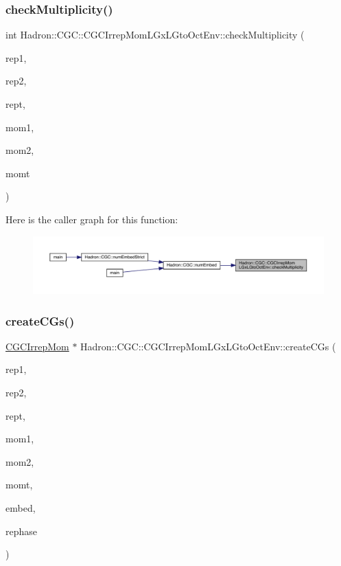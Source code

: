\subsubsection{\texorpdfstring{checkMultiplicity()}{checkMultiplicity()}}
{\footnotesize\ttfamily int Hadron\+::\+C\+G\+C\+::\+C\+G\+C\+Irrep\+Mom\+L\+Gx\+L\+Gto\+Oct\+Env\+::check\+Multiplicity (\begin{DoxyParamCaption}\item[{const std\+::string \&}]{rep1,  }\item[{const std\+::string \&}]{rep2,  }\item[{const std\+::string \&}]{rept,  }\item[{const Array\+Int \&}]{mom1,  }\item[{const Array\+Int \&}]{mom2,  }\item[{const Array\+Int \&}]{momt }\end{DoxyParamCaption})}

Here is the caller graph for this function\+:
\nopagebreak
\begin{figure}[H]
\begin{center}
\leavevmode
\includegraphics[width=350pt]{d1/d0f/namespaceHadron_1_1CGC_1_1CGCIrrepMomLGxLGtoOctEnv_aa39bf5f462bddb44a91da07a903947f4_icgraph}
\end{center}
\end{figure}
\mbox{\label{namespaceHadron_1_1CGC_1_1CGCIrrepMomLGxLGtoOctEnv_a326be3440106df05ce61c23e713f7312}} 
\subsubsection{\texorpdfstring{createCGs()}{createCGs()}}
{\footnotesize\ttfamily \mbox{\hyperlink{classHadron_1_1CGCIrrepMom}{C\+G\+C\+Irrep\+Mom}} $\ast$ Hadron\+::\+C\+G\+C\+::\+C\+G\+C\+Irrep\+Mom\+L\+Gx\+L\+Gto\+Oct\+Env\+::create\+C\+Gs (\begin{DoxyParamCaption}\item[{const std\+::string \&}]{rep1,  }\item[{const std\+::string \&}]{rep2,  }\item[{const std\+::string \&}]{rept,  }\item[{const Array\+Int \&}]{mom1,  }\item[{const Array\+Int \&}]{mom2,  }\item[{const Array\+Int \&}]{momt,  }\item[{int}]{embed,  }\item[{bool}]{rephase }\end{DoxyParamCaption})}

